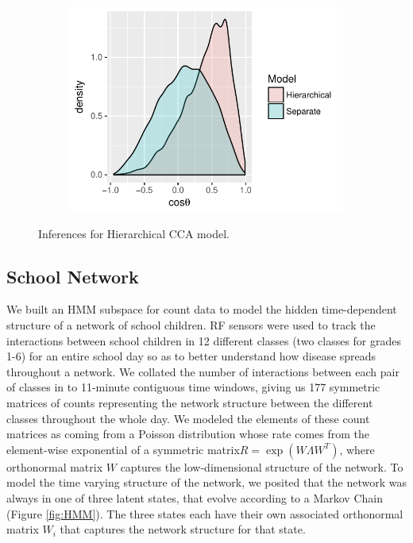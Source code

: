 \documentclass{article}
\begin{document}
\begin{figure}
    \begin{subfigure}[b]{0.3\textwidth}
        \includegraphics[width=\textwidth]{posteriorCosAngle.pdf}
        \caption{}
        \label{fig:posteriorCosAngle}
    \end{subfigure}
    \caption{Inferences for Hierarchical CCA model.}\label{fig:ccaResults}
\end{figure}

\subsection{School Network}
We built an HMM subspace for count data to model the hidden time-dependent structure of a network of school children. RF sensors \citep{stehle2011high} were used to track the interactions between school children in 12 different classes (two classes for grades 1-6) for an entire school day so as to better understand how disease spreads throughout a network. We collated the number of interactions between each pair of classes in to 11-minute contiguous time windows, giving us 177 symmetric matrices of counts representing the network structure between the different classes throughout the whole day. We modeled the elements of these count matrices as coming from a Poisson distribution whose rate comes from the element-wise exponential of a symmetric matrix$R = \exp (W \Lambda W^T)$, where orthonormal matrix $W$ captures the low-dimensional structure of the network. To model the time varying structure of the network, we posited that the network was always in one of three latent states, that evolve according to a Markov Chain (Figure \ref{fig:HMM}). The three states each have their own associated orthonormal matrix $W_i$ that captures the network structure for that state. 
\end{document}
